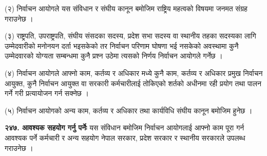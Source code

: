 (२) निर्वाचन आयोगले यस संविधान र संघीय कानून बमोजिम राष्ट्रिय महत्वको विषयमा जनमत संग्रह गराउनेछ ।

(३) राष्ट्रपति, उपराष्ट्रपति, संघीय संसदका सदस्य, प्रदेश सभा सदस्य वा स्थानीय तहका सदस्यका लागि उम्मेदवारीको मनोनयन दर्ता भइसकेको तर निर्वाचन परिणाम घोषणा भई नसकेको अवस्थामा कुनै उम्मेदवारको योग्यता सम्बन्धमा कुनै प्रश्न उठेमा त्यसको निर्णय निर्वाचन आयोगले गर्नेछ ।

(४) निर्वाचन आयोगले आफ्नो काम, कर्तव्य र अधिकार मध्ये कुनै काम, कर्तव्य र अधिकार प्रमुख निर्वाचन आयुक्त, कुनै निर्वाचन आयुक्त वा सरकारी कर्मचारीलाई तोकिएको शर्तको अधीनमा रही प्रयोग तथा पालन गर्ने गरी प्रत्यायोजन गर्न सक्नेछ ।

(५) निर्वाचन आयोगको अन्य काम, कर्तव्य र अधिकार तथा कार्यविधि संघीय कानून बमोजिम हुनेछ ।

\textbf{२४७. आवश्यक सहयोग गर्नु पर्नेः} यस संविधान बमोजिम निर्वाचन आयोगलाई आफ्नो काम पूरा गर्न आवश्यक पर्ने कर्मचारी र अन्य सहयोग नेपाल सरकार, प्रदेश सरकार र स्थानीय सरकारले उपलब्ध गराउनेछ ।